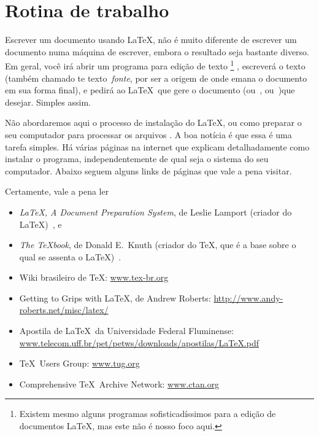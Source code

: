 \section{Rotina de trabalho}

Escrever um documento usando \LaTeX, não é muito diferente de escrever
um documento numa máquina de escrever, embora o resultado seja
bastante diverso. Em geral, você irá abrir um programa para edição
de texto%
\footnote{%
  Existem mesmo alguns programas sofisticadíssimos
  para a edição de documentos \LaTeX, mas este não é nosso foco
  aqui.}%
, escreverá o texto (também chamado te texto~\emph{fonte}, por ser a
origem de onde emana o documento em sua forma final), e pedirá ao \LaTeX\ que gere o
documento  (ou~, ou~)que
desejar. Simples assim.

Não abordaremos aqui o processo de instalação do \LaTeX, ou como
preparar o seu computador para processar os arquivos . A
boa notícia é que essa é uma tarefa simples. Há várias páginas na
internet que explicam detalhadamente como instalar o programa,
independentemente de qual seja o sistema do seu computador. Abaixo seguem
alguns links de páginas que vale a pena visitar.

Certamente, vale a pena ler 
\begin{itemize}
\item \emph{\LaTeX, A Document Preparation System}, de Leslie Lamport
  (criador do \LaTeX)~\cite{lamport},
  e
\item \emph{The \TeX book}, de Donald E.~Knuth (criador do \TeX, que é
  a base sobre o qual se assenta o \LaTeX)~\cite{texbook}.
\item Wiki brasileiro de \TeX: \url{www.tex-br.org}
\item Getting to Grips with \LaTeX, de Andrew Roberts: \url{http://www.andy-roberts.net/misc/latex/}
\item Apostila de \LaTeX\ da Universidade Federal Fluminense: \url{www.telecom.uff.br/pet/petws/downloads/apostilas/LaTeX.pdf}
\item \TeX\ Users Group: \url{www.tug.org}
\item Comprehensive \TeX\ Archive Network: \url{www.ctan.org}
\end{itemize}
